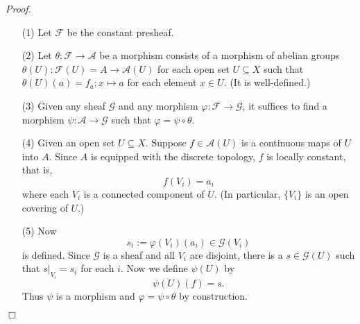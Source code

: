 \documentclass{article}
\begin{document}
\emph{Proof.}
\begin{enumerate}
\item[(1)]
  Let $\mathscr{F}$ be the constant presheaf.

\item[(2)]
  Let $\theta: \mathscr{F} \to \mathscr{A}$ be a morphism
  consists of a morphism of abelian groups $\theta(U): \mathscr{F}(U) = A \to \mathscr{A}(U)$
  for each open set $U \subseteq X$
  such that $\theta(U)(a) = f_a: x \mapsto a$ for each element $x \in U$. (It is well-defined.)

\item[(3)]
  Given any sheaf $\mathscr{G}$ and any morphism $\varphi: \mathscr{F} \to \mathscr{G}$,
  it suffices to find a morphism $\psi: \mathscr{A} \to \mathscr{G}$
  such that $\varphi = \psi \circ \theta$.

\item[(4)]
  Given an open set $U \subseteq X$.
  Suppose $f \in \mathscr{A}(U)$ is a continuous maps of $U$ into $A$.
  Since $A$ is equipped with the discrete topology, $f$ is locally constant, that is,
  \[
    f(V_i) = a_i
  \]
  where each $V_i$ is a connected component of $U$.
  (In particular, $\{V_i\}$ is an open covering of $U$.)

\item[(5)]
  Now
  \[
    s_i := \varphi(V_i)(a_i) \in \mathscr{G}(V_i)
  \]
  is defined.
  Since $\mathscr{G}$ is a sheaf and all $V_i$ are disjoint,
  there is a $s \in \mathscr{G}(U)$ such that $s|_{V_i} = s_i$ for each $i$.
  Now we define $\psi(U)$ by
  \[
    \psi(U)(f) = s.
  \]
  Thus $\psi$ is a morphism and $\varphi = \psi \circ \theta$ by construction.
\end{enumerate}
$\Box$ \\\\



\end{document}
